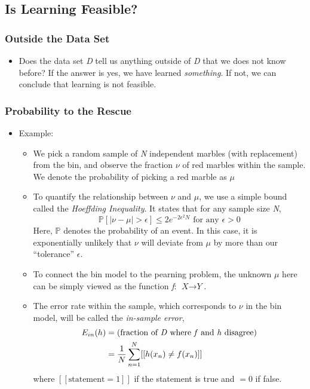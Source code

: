\documentclass[11pt]{article}
\theoremstyle{definition}
\begin{document}
\subsection{Is Learning Feasible?}
\subsubsection{Outside the Data Set}
\begin{itemize}[noitemsep, topsep=0pt]
    \item Does the data set \textit{D} tell us anything outside of \textit{D} that we does not know before? If the answer is yes, we have learned \textit{something}. If not, we can conclude that learning is not feasible.
\end{itemize}

\subsubsection{Probability to the Rescue}
\begin{itemize}[noitemsep, topsep=0pt]
    \item Example:
    \begin{itemize}[noitemsep, topsep=0pt]
        \item We pick a random sample of \textit{N} independent marbles (with replacement) from the bin, and observe the fraction $\nu$ of red marbles within the sample. We denote the probability of picking a red marble as $\mu$
        \item To quantify the relationship between $\nu$ and $\mu$, we use a simple bound called the \textit{Hoeffding Inequality}. It states that for any sample size \textit{N},
        \begin{equation}
            \mathbb{P}[|\nu - \mu| > \epsilon] \leq 2e^{-2\epsilon^2N}  \text{ for any $\epsilon > 0$}
        \end{equation}
        Here, $\mathbb{P}$ denotes the probability of an event. In this case, it is exponentially unlikely that $\nu$ will deviate from $\mu$ by more than our ``tolerance'' $\epsilon$.
        \item To connect the bin model to the pearning problem, the unknown $\mu$ here can be simply viewed as the function \textit{f}: $\textit{X} \rightarrow \textit{Y}$.
        \item The error rate within the sample, which corresponds to $\nu$ in the bin model, will be called the \textit{in-sample error},
        \begin{equation}
        \begin{aligned}
            E_{in}(h) &= \text{(fraction of \textit{D} where \textit{f} and \textit{h} disagree)}\\
                      &= \frac{1}{N} \sum_{n=1}^{N} [[h(x_n) \neq f(x_n)]]
        \end{aligned}
        \end{equation}
        where $[[\text{statement} = 1]]$ if the statement is true and $= 0$ if false.
    \end{itemize}
\end{itemize}
\end{document}
